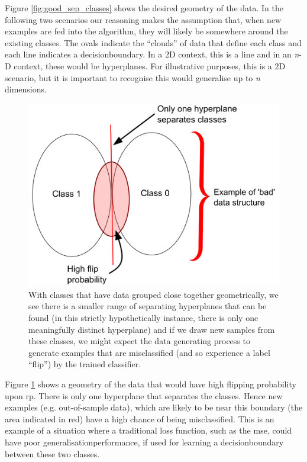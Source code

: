 Figure \ref{fig:good_sep_classes} shows the desired geometry of the data. In the following two scenarios our reasoning makes the assumption that, when new examples are fed into the algorithm, they will likely be somewhere around the existing classes. The ovals indicate the \enquote{clouds} of data that define each class and each line indicates a \gls{decisionboundary}. In a 2D context, this is a line and in an \textit{n}-D context, these would be \gls{hyperplane}s. For illustrative purposes, this is a 2D scenario, but it is important to recognise this would generalise up to \textit{n} dimensions.
\bigskip


\begin{figure}[H]
    \centering
    \includegraphics[width=\textwidth]{figs/hyperplanes_poor_classes.png}
    \caption[Illustration of poorly separated classes.]{With classes that have data grouped close together geometrically, we see there is a smaller range of separating hyperplanes that can be found (in this strictly hypothetically instance, there is only one meaningfully distinct hyperplane) and if we draw new samples from these classes, we might expect the data generating process to generate examples that are misclassified (and so experience a label \enquote{flip}) by the trained classifier.}
    \label{fig:poor_sep_classes}
\end{figure}

Figure \ref{fig:poor_sep_classes} shows a geometry of the data that would have high flipping probability upon \gls{rp}. There is only one \gls{hyperplane} that separates the classes. Hence new examples (e.g. out-of-sample data), which are likely to be near this boundary (the area indicated in red) have a high chance of being misclassified. This is an example of a situation where a traditional loss function, such as the \gls{mse}, could have poor \gls{generalisationperformance}, if used for learning a \gls{decisionboundary} between these two classes. 
\bigskip

